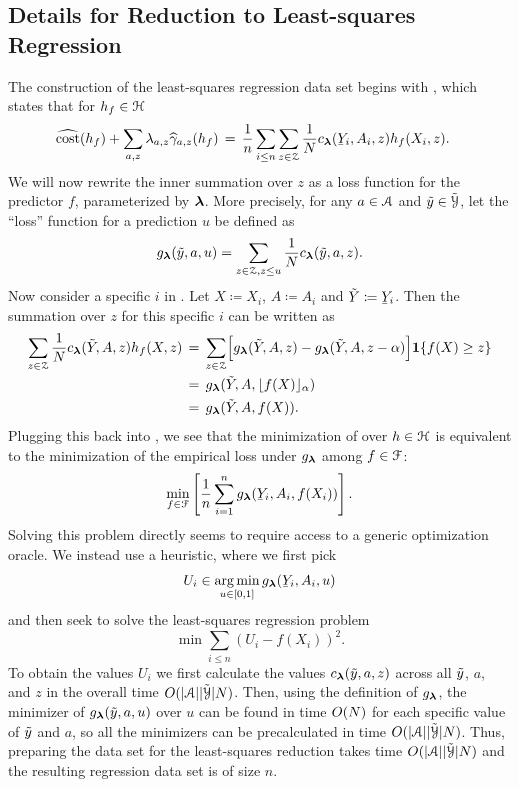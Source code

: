 \subsection{Details for Reduction to Least-squares Regression}
\label{sec:app:impl:ls}

The construction of the least-squares regression data set begins with , which states
that for $h_f\in\mathcal{H}$
%
\begin{align}
  \hcost(h_f)
  +
  \sum_{a,z}\lambda_{a,z}\hgamma_{a,z}(h_f)
\label{eq:c:lambda:2}
&\,=\,
  \frac1n\sum_{i\le n}\sum_{z\in\calZ}
     \frac1N c_{\vlambda}(\underY_i,A_i,z)h_f(X_i,z).
\end{align}
%
We will now rewrite the inner summation over $z$ as a loss function for the predictor $f$, parameterized by $\boldsymbol{\lambda}$. More precisely, for any $a\in\mathcal{A}$ and $\tilde{y}\in\tilde{\mathcal{Y}}$, let the ``loss'' function for a prediction $u$ be defined as
\[
  g_{\boldsymbol{\lambda}}(\tilde{y},a,u)=\sum_{z\in\mathcal{Z}, z\le u}\frac1N c_{\boldsymbol{\lambda}}(\tilde{y},a,z).
\]
Now consider a specific $i$ in . Let $X\coloneqq X_i$, $A\coloneqq A_i$ and $\tY\coloneqq \underY_i$. Then the summation over $z$ for this specific $i$ can be written as
%
\begin{align*}
\sum_{z\in\mathcal{Z}}
     \frac1N
     c_{\boldsymbol{\lambda}}(\tilde{Y},A,z)h_f(X,z)
&\,=\,
\sum_{z\in\mathcal{Z}}
     \Bigl[g_{\boldsymbol{\lambda}}(\tilde{Y},A,z)-g_{\boldsymbol{\lambda}}(\tilde{Y},A,z-\alpha)\Bigr]\mathbf{1}\{f(X)\ge z\}
\\
&\,=\,
  g_{\boldsymbol{\lambda}}(\tilde{Y},A,\lfloor f(X)\rfloor_\alpha)
\\
&\,=\,
  g_{\boldsymbol{\lambda}}(\tilde{Y},A,f(X))
.
\end{align*}
%
Plugging this back into , we see that the minimization of  over $h\in\mathcal{H}$ is equivalent to the minimization of the empirical loss under $g_{\boldsymbol{\lambda}}$ among $f\in\mathcal{F}$:
\[
  \min_{f\in\calF}
  \Bracks{
  \frac1n\sum_{i=1}^n
     g_{\vlambda}(\underY_i,A_i,f(X_i))
  }.
\]
Solving this problem directly seems to require access to a generic optimization oracle. We instead use a heuristic, where we first pick
\[
  U_i\in\argmin_{u\in[0,1]} g_{\vlambda}(\underY_i,A_i,u)
\]
and then seek to solve the least-squares regression problem
\[
  \min\sum_{i\le n} (U_i-f(X_i))^2
.
\]
To obtain the values $U_i$ we first calculate the values $c_{\boldsymbol{\lambda}}(\tilde{y},a,z)$ across all $\tilde{y}$, $a$, and $z$
in the overall time $O(\lvert\mathcal{A}\rvert\lvert\tilde{\mathcal{Y}}\rvert N)$. Then, using the definition of $g_{\boldsymbol{\lambda}}$, the minimizer
of $g_{\boldsymbol{\lambda}}(\tilde{y},a,u)$ over $u$ can be found in time $O(N)$ for each specific value of $\tilde{y}$ and $a$, so
all the minimizers can be precalculated in time $O(\lvert\mathcal{A}\rvert\lvert\tilde{\mathcal{Y}}\rvert N)$. Thus, preparing the data set for
the least-squares reduction takes time $O(\lvert\mathcal{A}\rvert\lvert\tilde{\mathcal{Y}}\rvert N)$ and the resulting regression data set
is of size $n$.

